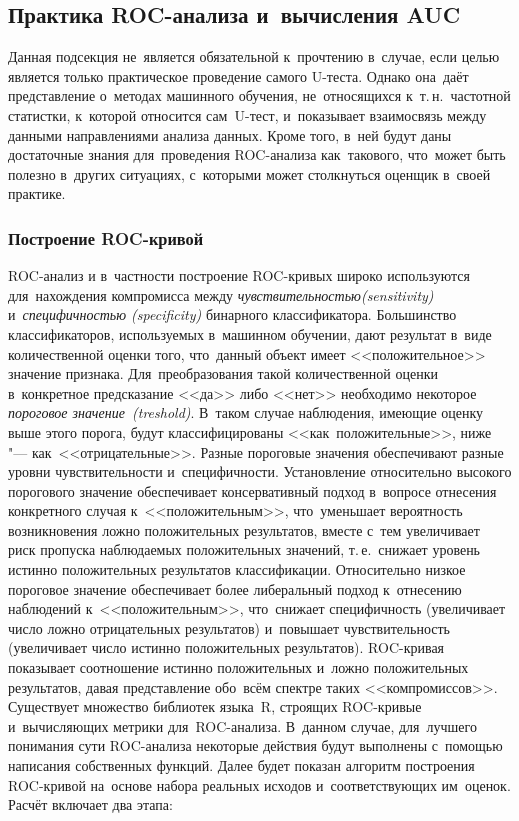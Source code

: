 \documentclass[]{scrreprt}
\begin{document}
\subsection{Практика ROC-анализа и~вычисления AUC}\label{ROC-AUC-theory}
Данная подсекция не~является обязательной к~прочтению в~случае, если целью является только практическое проведение самого U-теста. Однако она~даёт представление о~методах машинного обучения, не~относящихся к~т.\,н.~частотной статистки, к~которой относится сам~U-тест, и~показывает взаимосвязь между данными направлениями анализа данных. Кроме того, в~ней будут даны достаточные знания для~проведения ROC-анализа как~такового, что~может быть полезно в~других ситуациях, с~которыми может столкнуться оценщик в~своей практике.
\subsubsection{Построение ROC-кривой}\label{plot-ROC-theory}
%
%
ROC-анализ и в~частности построение ROC-кривых широко используются для~нахождения компромисса между \emph{чувствительностью(\foreignlanguage{english}{sensitivity})} и~\emph{специфичностью (\foreignlanguage{english}{specificity})} бинарного классификатора. Большинство классификаторов, используемых в~машинном обучении, дают результат в~виде количественной оценки того, что~данный объект имеет <<положительное>> значение признака. Для~преобразования такой количественной оценки в~конкретное предсказание <<да>> либо <<нет>> необходимо некоторое \emph{пороговое значение~(\foreignlanguage{english}{treshold})}. В~таком случае наблюдения, имеющие оценку выше этого порога, будут классифицированы <<как~положительные>>, ниже "--- как~<<отрицательные>>. Разные пороговые значения обеспечивают разные уровни чувствительности и~специфичности. Установление относительно высокого порогового значение обеспечивает консервативный подход в~вопросе отнесения конкретного случая к~<<положительным>>, что~уменьшает вероятность возникновения ложно положительных результатов, вместе с~тем увеличивает риск пропуска наблюдаемых положительных значений, т.\,е.~снижает уровень истинно положительных результатов классификации. Относительно низкое пороговое значение обеспечивает более либеральный подход к~отнесению наблюдений к~<<положительным>>, что~снижает специфичность  (увеличивает число ложно отрицательных результатов) и~повышает чувствительность (увеличивает число истинно положительных результатов). ROC-кривая показывает соотношение истинно положительных и~ложно положительных результатов, давая представление обо~всём спектре таких <<компромиссов>>. Существует множество библиотек языка~R, строящих ROC-кривые и~вычисляющих метрики для~ROC-анализа. В~данном случае, для~лучшего понимания сути ROC-анализа некоторые действия будут выполнены с~помощью написания собственных функций. Далее будет показан алгоритм построения ROC-кривой на~основе набора реальных исходов и~соответствующих им~оценок. Расчёт включает два этапа:
\end{document}
